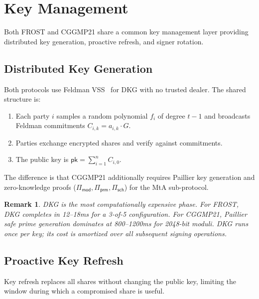 \documentclass[11pt,twocolumn]{article}
\newtheorem{remark}{Remark}[section]
\begin{document}
\section{Key Management}
\label{sec:keymgmt}

Both FROST and CGGMP21 share a common key management layer providing distributed key
generation, proactive refresh, and signer rotation.

\subsection{Distributed Key Generation}

Both protocols use Feldman VSS~\cite{feldman1987} for DKG with no trusted dealer.
The shared structure is:

\begin{enumerate}[nosep]
  \item Each party $i$ samples a random polynomial $f_i$ of degree $t-1$ and broadcasts
    Feldman commitments $C_{i,k} = a_{i,k} \cdot G$.
  \item Parties exchange encrypted shares and verify against commitments.
  \item The public key is $\mathsf{pk} = \sum_{i=1}^n C_{i,0}$.
\end{enumerate}

The difference is that CGGMP21 additionally requires Paillier key generation and
zero-knowledge proofs ($\Pi_{\mathsf{mod}}, \Pi_{\mathsf{prm}}, \Pi_{\mathsf{sch}}$)
for the MtA sub-protocol.

\begin{remark}
DKG is the most computationally expensive phase. For FROST, DKG completes in 12--18ms
for a 3-of-5 configuration. For CGGMP21, Paillier safe prime generation dominates at
800--1200ms for 2048-bit moduli. DKG runs once per key; its cost is amortized over all
subsequent signing operations.
\end{remark}

\subsection{Proactive Key Refresh}
\label{sec:refresh}

Key refresh replaces all shares without changing the public key, limiting the window
during which a compromised share is useful.
\end{document}
